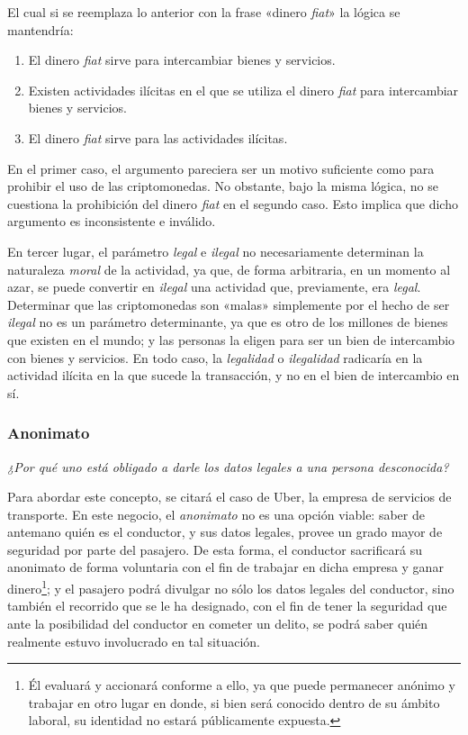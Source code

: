 \documentclass[12pt,a4paper,twoside]{book}
\begin{document}
El cual si se reemplaza lo anterior con la frase «dinero \textit{fiat}» la lógica se mantendría:

\begin{enumerate}
\item El dinero \textit{fiat} sirve para intercambiar bienes y servicios.
\item Existen actividades ilícitas en el que se utiliza el dinero \textit{fiat} para intercambiar bienes y servicios.
\item El dinero \textit{fiat} sirve para las actividades ilícitas.
\end{enumerate}

En el primer caso, el argumento pareciera ser un motivo suficiente como para prohibir el uso de las criptomonedas. No obstante, bajo la misma lógica, no se cuestiona la prohibición del dinero \textit{fiat} en el segundo caso. Esto implica que dicho argumento es inconsistente e inválido.

En tercer lugar, el parámetro \textit{legal} e \textit{ilegal} no necesariamente determinan la naturaleza \textit{moral} de la actividad, ya que, de forma arbitraria, en un momento al azar, se puede convertir en \textit{ilegal} una actividad que, previamente, era \textit{legal}. Determinar que las criptomonedas son «malas» simplemente por el hecho de ser \textit{ilegal} no es un parámetro determinante, ya que es otro de los millones de bienes que existen en el mundo; y las personas la eligen para ser un bien de intercambio con bienes y servicios. En todo caso, la \textit{legalidad} o \textit{ilegalidad} radicaría en la actividad ilícita en la que sucede la transacción, y no en el bien de intercambio en sí.

\subsubsection{Anonimato}
\begin{flushright}
\textit{¿Por qué uno está obligado a darle los datos legales a una persona desconocida?}
\end{flushright}

Para abordar este concepto, se citará el caso de Uber, la empresa de servicios de transporte. En este negocio, el \textit{anonimato} no es una opción viable: saber de antemano quién es el conductor, y sus datos legales, provee un grado mayor de seguridad por parte del pasajero. De esta forma, el conductor sacrificará su anonimato de forma voluntaria con el fin de trabajar en dicha empresa y ganar dinero\footnote{Él evaluará y accionará conforme a ello, ya que puede permanecer anónimo y trabajar en otro lugar en donde, si bien será conocido dentro de su ámbito laboral, su identidad no estará públicamente expuesta.}; y el pasajero podrá divulgar no sólo los datos legales del conductor, sino también el recorrido que se le ha designado, con el fin de tener la seguridad que ante la posibilidad del conductor en cometer un delito, se podrá saber quién realmente estuvo involucrado en tal situación.
\end{document}
